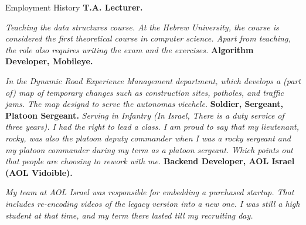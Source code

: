 

\begin{rubric}{Employment History} 
  \entry*[2022 - now ] 
  \textbf{T.A. Lecturer.} \par  
  \emph{Teaching the data structures course. At the Hebrew University, the course is considered the first theoretical course in computer science. Apart from teaching, the role also requires writing the exam and the exercises.}     
  \entry*[2020]%
  \textbf{Algorithm Developer, Mobileye.}\par 
  \emph{In the Dynamic Road Experience Management department, which develops a (part of) map of temporary changes such as construction sites, potholes, and traffic jams. The map designd to serve the autonomas viechele.} 
  \entry*[2015 -- 2018]%
  \textbf{Soldier, Sergeant, Platoon Sergeant.}  
  \ifdefined\ARMY
\emph{Serving in Infantry (In Israel, There is a duty service of three years). I had the right to lead a class. I am proud to say that my lieutenant, rocky, was also the platoon deputy commander when I was a rocky sergeant and my platoon commander during my term as a platoon sergeant. Which points out that people are choosing to rework with me. } 
\fi
  \entry*[2014 - 2015]%
  \textbf{Backend Developer, AOL Israel (AOL Vidoible).}\par 
  \emph{My team at AOL Israel was responsible for embedding a purchased startup. That includes re-encoding videos of the legacy version into a new one. I was still a high student at that time, and my term there lasted till my recruiting day. }  
\end{rubric}
